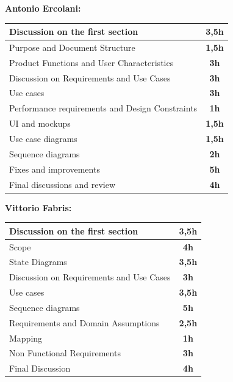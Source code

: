 \documentclass[]{article}
\begin{document}
	\medskip
	\textbf{\large Antonio Ercolani:} \\ \newline
	\begin{tabular}{|l|c|}
		\hline
		\begin{minipage}[t]{8cm}
			Discussion on the first section
		\end{minipage} &  \textbf{3,5h} \\ \hline
		\rowcolor[HTML]{DCDCDC} 
		Purpose and Document Structure & \textbf{1,5h} \\ \hline
		Product Functions and User Characteristics & \textbf{3h} \\ \hline
		\rowcolor[HTML]{DCDCDC}
		Discussion on Requirements and Use Cases & \textbf{3h} \\ \hline
		Use cases & \textbf{3h} \\ \hline
		\rowcolor[HTML]{DCDCDC}
		Performance requirements and Design Constraints & \textbf{1h} \\ \hline
		UI and mockups & \textbf{1,5h} \\ \hline
		\rowcolor[HTML]{DCDCDC}
		Use case diagrams & \textbf{1,5h} \\ \hline
		Sequence diagrams & \textbf{2h} \\ \hline
		\rowcolor[HTML]{DCDCDC}
		Fixes and improvements & \textbf{5h} \\ \hline
		Final discussions and review & \textbf{4h} \\ \hline
	\end{tabular}
	
	
	\textbf{} \newline
	\textbf{} \newline

	\textbf{\large Vittorio Fabris:} \\ \newline
		\begin{tabular}{|l|c|}
			\hline
			\begin{minipage}[t]{8cm}
				Discussion on the first section
			\end{minipage} &  \textbf{3,5h} \\ \hline
			\rowcolor[HTML]{DCDCDC} 
			Scope & \textbf{4h} \\ \hline
			State Diagrams & \textbf{3,5h} \\ \hline
			\rowcolor[HTML]{DCDCDC} 
			Discussion on Requirements and Use Cases & \textbf{3h} \\ \hline
			Use cases & \textbf{3,5h} \\ \hline
			\rowcolor[HTML]{DCDCDC}
			Sequence diagrams & \textbf{5h} \\ \hline
			Requirements and Domain Assumptions  & \textbf{2,5h} \\ \hline
			\rowcolor[HTML]{DCDCDC}
			Mapping & \textbf{1h} \\ \hline
			Non Functional Requirements & \textbf{3h} \\ \hline
			\rowcolor[HTML]{DCDCDC}
			Final Discussion & \textbf{4h} \\ \hline
		\end{tabular}
		
\end{document}
